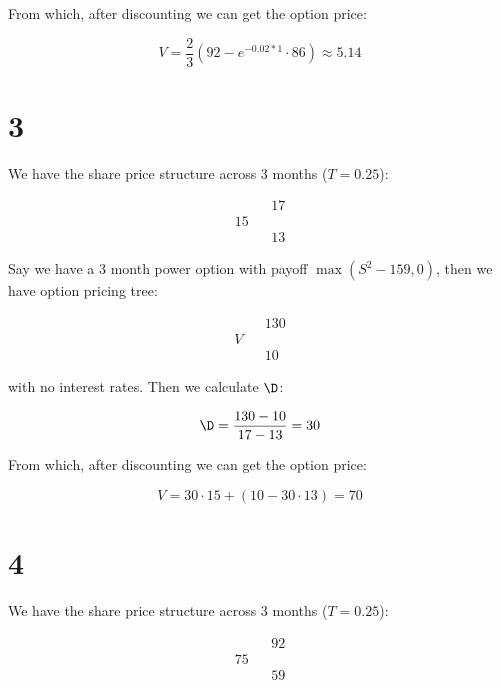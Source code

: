 \documentclass{article}
\begin{document}
	From which, after discounting we can get the option price:
	
	\begin{equation*}
		V = \frac{2}{3}(92 - e^{-0.02 * 1}\cdot 86) \approx 5.14
	\end{equation*}
	
	\section*{3}
	
	We have the share price structure across 3 months ($T = 0.25$):
	
	\begin{equation*}
		\begin{array}{ccc}
			   &   & 17 \\
			15 &   & \\
			   &   & 13
		\end{array}
	\end{equation*}
	
	Say we have a 3 month power option with payoff $\max(S^2 - 159,0)$, then we have option pricing tree:
	
	\begin{equation*}
		\begin{array}{ccc}
			   &   & 130 \\
			V  &   & \\
		   	   &   & 10
		\end{array}
	\end{equation*} 
	
	with no interest rates. Then we calculate $\D$:
	
	\begin{equation*}
		\D = \frac{130 - 10}{17 - 13} = 30
	\end{equation*}
	
	From which, after discounting we can get the option price:
	
	\begin{equation*}
		V = 30 \cdot 15 + (10 - 30 \cdot 13) = 70
	\end{equation*}
	
	\section*{4}
	
	We have the share price structure across 3 months ($T = 0.25$):
	
	\begin{equation*}
		\begin{array}{ccc}
			   &   & 92 \\
			75 &   & \\
			   &   & 59
		\end{array}
	\end{equation*}
\end{document}
